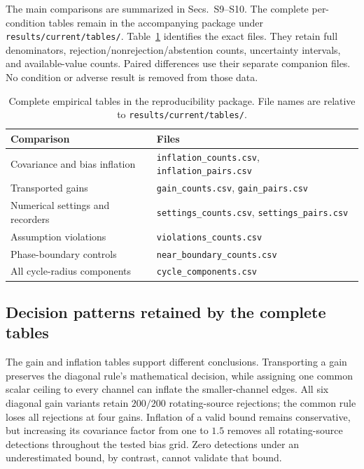 The main comparisons are summarized in Secs.~S9--S10. The complete per-condition tables remain in the accompanying package under \texttt{results/current/tables/}. Table~\ref{tab:retained-csv} identifies the exact files. They retain full denominators, rejection/nonrejection/abstention counts, uncertainty intervals, and available-value counts. Paired differences use their separate companion files. No condition or adverse result is removed from those data.

\begin{table}[ht]\centering
\caption{Complete empirical tables in the reproducibility package. File names are relative to \texttt{results/current/tables/}.}\label{tab:retained-csv}
\begin{tabular}{p{}p{}}\toprule
Comparison & Files \\\midrule
Covariance and bias inflation & \texttt{inflation\_counts.csv}, \texttt{inflation\_pairs.csv}\\
Transported gains & \texttt{gain\_counts.csv}, \texttt{gain\_pairs.csv}\\
Numerical settings and recorders & \texttt{settings\_counts.csv}, \texttt{settings\_pairs.csv}\\
Assumption violations & \texttt{violations\_counts.csv}\\
Phase-boundary controls & \texttt{near\_boundary\_counts.csv}\\
All cycle-radius components & \texttt{cycle\_components.csv}\\\bottomrule
\end{tabular}
\end{table}

\subsection{Decision patterns retained by the complete tables}
The gain and inflation tables support different conclusions. Transporting a gain preserves the diagonal rule's mathematical decision, while assigning one common scalar ceiling to every channel can inflate the smaller-channel edges. All six diagonal gain variants retain $200/200$ rotating-source rejections; the common rule loses all rejections at four gains. Inflation of a valid bound remains conservative, but increasing its covariance factor from one to $1.5$ removes all rotating-source detections throughout the tested bias grid. Zero detections under an underestimated bound, by contrast, cannot validate that bound.

